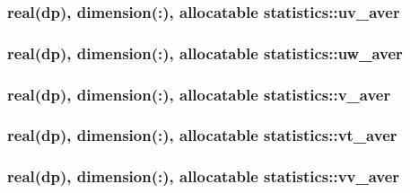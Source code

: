 \hypertarget{classstatistics_ab43692704bce4eafd0dccedc12d43dbf}{
\subsubsection[{uv\-\_\-aver}]{\setlength{\rightskip}{0pt plus 5cm}real(dp), dimension(\-:), allocatable statistics\-::uv\-\_\-aver}}\label{classstatistics_ab43692704bce4eafd0dccedc12d43dbf}
\hypertarget{classstatistics_ae392f133c2869e56a9820192215ff81f}{
\subsubsection[{uw\-\_\-aver}]{\setlength{\rightskip}{0pt plus 5cm}real(dp), dimension(\-:), allocatable statistics\-::uw\-\_\-aver}}\label{classstatistics_ae392f133c2869e56a9820192215ff81f}
\hypertarget{classstatistics_a1b8da3276de56334fdcf742802f8f6e2}{
\subsubsection[{v\-\_\-aver}]{\setlength{\rightskip}{0pt plus 5cm}real(dp), dimension(\-:), allocatable statistics\-::v\-\_\-aver}}\label{classstatistics_a1b8da3276de56334fdcf742802f8f6e2}
\hypertarget{classstatistics_a5ae297f67d308ec03226af19b4aff209}{
\subsubsection[{vt\-\_\-aver}]{\setlength{\rightskip}{0pt plus 5cm}real(dp), dimension(\-:), allocatable statistics\-::vt\-\_\-aver}}\label{classstatistics_a5ae297f67d308ec03226af19b4aff209}
\hypertarget{classstatistics_a23adca9074a2f80d8ceb57bbb5edd745}{
\subsubsection[{vv\-\_\-aver}]{\setlength{\rightskip}{0pt plus 5cm}real(dp), dimension(\-:), allocatable statistics\-::vv\-\_\-aver}}\label{classstatistics_a23adca9074a2f80d8ceb57bbb5edd745}
